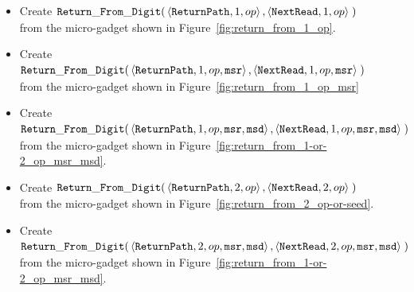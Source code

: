 \begin{itemize}

    \item Create
    $\begin{aligned}[t]
        {\tt Return\_From\_Digit}(& \left\langle {\tt ReturnPath},    1, op \right\rangle,
                           \left\langle {\tt NextRead}, 1, op \right\rangle \;)
    \end{aligned}$\\from the micro-gadget shown in Figure~\ref{fig:return_from_1_op}.

    \item Create
    $\begin{aligned}[t]
        {\tt Return\_From\_Digit}(& \left\langle {\tt ReturnPath},    1, op, {\tt msr} \right\rangle,
                           \left\langle {\tt NextRead}, 1, op, {\tt msr} \right\rangle \;)
    \end{aligned}$\\from the micro-gadget shown in Figure~\ref{fig:return_from_1_op_msr}

    \item Create
    $\begin{aligned}[t]
        {\tt Return\_From\_Digit}(& \left\langle {\tt ReturnPath},    1, op, {\tt msr}, {\tt msd} \right\rangle,
                           \left\langle {\tt NextRead}, 1, op, {\tt msr}, {\tt msd} \right\rangle \;)
    \end{aligned}$\\from the micro-gadget shown in Figure~\ref{fig:return_from_1-or-2_op_msr_msd}.


    \item Create
    $\begin{aligned}[t]
        {\tt Return\_From\_Digit}(& \left\langle {\tt ReturnPath},    2, op \right\rangle,
                           \left\langle {\tt NextRead}, 2, op \right\rangle \;)
    \end{aligned}$\\from the micro-gadget shown in Figure~\ref{fig:return_from_2_op-or-seed}.

    \item Create
    $\begin{aligned}[t]
        {\tt Return\_From\_Digit}(& \left\langle {\tt ReturnPath},    2, op, {\tt msr}, {\tt msd} \right\rangle,
                           \left\langle {\tt NextRead}, 2, op, {\tt msr}, {\tt msd} \right\rangle \;)
    \end{aligned}$\\from the micro-gadget shown in Figure~\ref{fig:return_from_1-or-2_op_msr_msd}.




\end{itemize}
